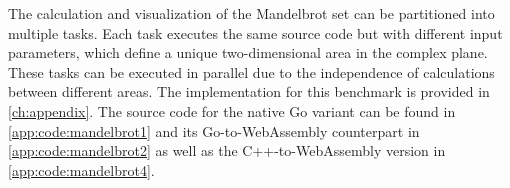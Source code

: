 The calculation and visualization of the Mandelbrot set can be partitioned into multiple tasks. Each task executes the same source code but with different input parameters, which define a unique two-dimensional area in the complex plane. These tasks can be executed in parallel due to the independence of calculations between different areas. The implementation for this benchmark is provided in \autoref{ch:appendix}. The source code for the native Go variant can be found in \autoref{app:code:mandelbrot1} and its Go-to-WebAssembly counterpart in \autoref{app:code:mandelbrot2} as well as the C++-to-WebAssembly version in \autoref{app:code:mandelbrot4}.
